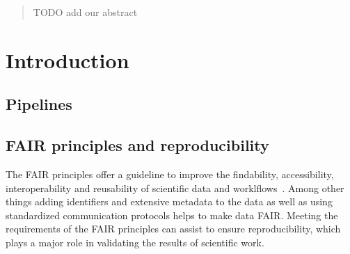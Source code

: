 \documentclass{article}
\theoremstyle{plain}
\theoremstyle{definition}
\theoremstyle{remark}
\begin{document}
\begin{abstract}
TODO add our abstract
\end{abstract}

%

\section{Introduction}
\subsection{Pipelines}
\subsection{FAIR principles and reproducibility}
The FAIR principles offer a guideline to improve the findability, accessibility, interoperability and reusability of scientific data and worklflows~\cite{wilkinson2016fair}. 
Among other things adding identifiers and extensive metadata to the data as well as using standardized communication protocols helps to make data FAIR.
Meeting the requirements of the FAIR principles can assist to ensure reproducibility, which plays a major role in validating the results of scientific work.
\end{document}
